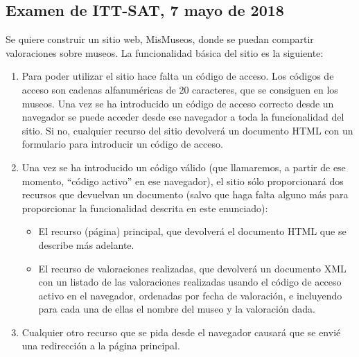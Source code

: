 \subsection{Examen de ITT-SAT, 7 mayo de 2018}


Se quiere construir un sitio web, MisMuseos, donde se puedan compartir valoraciones sobre museos. La funcionalidad básica del sitio es la siguiente:

\begin{enumerate}
\item Para poder utilizar el sitio hace falta un código de acceso. Los códigos de acceso son cadenas alfanuméricas de 20 caracteres, que se consiguen en los museos. Una vez se ha introducido un código de acceso correcto desde un navegador se puede acceder desde ese navegador a toda la funcionalidad del sitio. Si no, cualquier recurso del sitio devolverá un documento HTML con un formulario para introducir un código de acceso.

\item Una vez se ha introducido un código válido (que llamaremos, a partir de ese momento, ``código activo'' en ese navegador), el sitio sólo proporcionará dos recursos que devuelvan un documento (salvo que haga falta alguno más para proporcionar la funcionalidad descrita en este enunciado):
  \begin{itemize}
  \item El recurso (página) principal, que devolverá el documento HTML que se describe más adelante.
  \item El recurso de valoraciones realizadas, que devolverá un documento XML con un listado de las valoraciones realizadas usando el código de acceso activo en el navegador, ordenadas por fecha de valoración, e incluyendo para cada una de ellas el nombre del museo y la valoración dada.
  \end{itemize}

\item Cualquier otro recurso que se pida desde el navegador causará que se envié una redirección a la página principal.


\end{enumerate}
